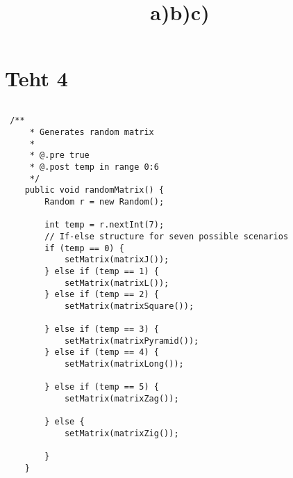\documentclass[a4paper,12pt,titlepage]{article}
\theoremstyle{definition}
\theoremstyle{remark}
\begin{document}
\section{Teht 4}
\title{a)}
\begin{lstlisting}

\end{lstlisting}
\title{b)}
\begin{lstlisting}
 /**
     * Generates random matrix
     * 
     * @.pre true
     * @.post temp in range 0:6
     */
    public void randomMatrix() {
        Random r = new Random();

        int temp = r.nextInt(7);
        // If-else structure for seven possible scenarios
        if (temp == 0) {
            setMatrix(matrixJ());
        } else if (temp == 1) {
            setMatrix(matrixL());
        } else if (temp == 2) {
            setMatrix(matrixSquare());

        } else if (temp == 3) {
            setMatrix(matrixPyramid());
        } else if (temp == 4) {
            setMatrix(matrixLong());

        } else if (temp == 5) {
            setMatrix(matrixZag());

        } else {
            setMatrix(matrixZig());

        }
    }    
\end{lstlisting}
\title{c)}
\end{document}
